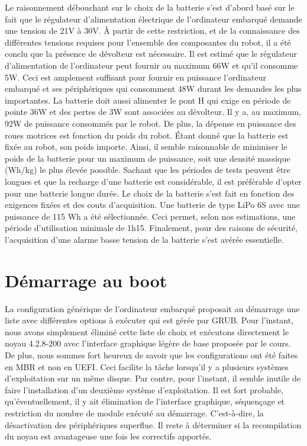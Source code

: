 Le raisonnement débouchant sur le choix de la batterie s'est d'abord basé sur le fait que le régulateur d'alimentation électrique de l'ordinateur embarqué demande une tension de 21V à 30V. À partir de cette restriction, et de la connaissance des différentes tensions  requises pour l'ensemble des composantes du robot, il a été conclu que la présence de dévolteur est nécessaire. Il est estimé que le régulateur d'alimentation de l'ordinateur peut fournir au maximum 66W et qu'il consomme 5W. Ceci est amplement suffisant pour fournir en puissance l'ordinateur embarqué et ses périphériques qui consomment 48W durant les demandes les plus importantes. La batterie doit aussi alimenter le pont H qui exige en période de pointe 36W et des pertes de 3W sont associées au dévolteur. Il y a, au maximum, 92W de puissance consommés par le robot. De plus, la dépense en puissance des roues motrices est fonction du poids du robot. Étant donné que la batterie est fixée au robot, son poids importe. Ainsi, il semble raisonnable de  minimiser le poids de la batterie pour un maximum de puissance, soit une densité massique (Wh/kg) le plus élevée possible. Sachant que les périodes de tests peuvent être longues et que la recharge d'une batterie est considérable, il est préférable d'opter pour une batterie longue durée. Le choix de la batterie s'est fait en fonction des exigences fixées et des couts d'acquisition. Une batterie de type LiPo 6S avec une puissance de 115 Wh a été sélectionnée. Ceci permet, selon nos estimations, une période d'utilisation minimale de 1h15. Finalement, pour des raisons de sécurité, l'acquisition d'une alarme basse tension de la batterie s'est avérée essentielle. 



\section{Démarrage au boot}
La configuration générique de l’ordinateur embarqué proposait au démarrage une liste avec différentes options à exécuter qui est gérée par GRUB. Pour l’instant, nous avons simplement éliminé cette liste de choix et exécutons directement le noyau 4.2.8-200 avec l’interface graphique légère de base proposée par le cours. De plus, nous sommes fort heureux de savoir que les configurations ont été faites en MBR et non en UEFI. Ceci facilite la tâche lorsqu’il y a plusieurs systèmes d’exploitation sur un même disque. Par contre, pour l’instant, il semble inutile de faire l’installation d’un deuxième système d’exploitation. Il est fort probable, qu’éventuellement, il y ait élimination de l’interface graphique, séquençage et restriction du nombre de module exécuté au démarrage. C’est-à-dire, la désactivation des périphériques superflue. Il reste à déterminer si la recompilation du noyau est avantageuse une fois les correctifs apportés.  
